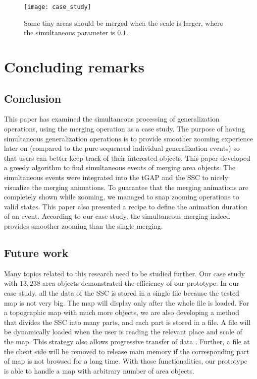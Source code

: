\documentclass[twocolumn]{svjour3}          %
\begin{document}
\begin{figure}[tb]
\centering
\texttt{[image: case\_study]}
\caption{
    Some tiny areas should be merged when the scale is larger,
    where the simultaneous parameter is $0.1$.
}
\label{fig:problem}
\end{figure}




\section{Concluding remarks}
\label{sec:concluding_remarks}

\subsection{Conclusion}
This paper has examined the simultaneous processing 
of generalization operations,
using the merging operation as a case study. 
The purpose of having simultaneous generalization operations 
is to provide smoother zooming experience later on 
(compared to the pure sequenced individual generalization events)
so that users can better keep track of their interested objects.
This paper developed a greedy algorithm to find simultaneous events of 
merging area objects.
The simultaneous events were integrated into 
the tGAP and the SSC to nicely visualize the merging animations.
To guarantee that the merging animations 
are completely shown while zooming, 
we managed to snap zooming operations to valid states.
This paper also presented a recipe 
to define the animation duration of an event.
According to our case study,
the simultaneous merging indeed provides smoother zooming
than the single merging.




\subsection{Future work}

Many topics related to this research need to be studied further.
Our case study with $13{,}238$ area objects 
demonstrated the efficiency of our prototype.
In our case study, all the data of the SSC is stored in a single file
because the tested map is not very big.
The map will display only after the whole file is loaded.
For a topographic map with much more objects,
we are also developing a method that divides the SSC into many parts, 
and each part is stored in a file.
A file will be dynamically loaded 
when the user is reading the relevant place and scale of the map.
This strategy also allows progressive transfer of data
\citep{vanOosterom2014Support}.
Further, a file at the client side will be removed to release main memory
if the corresponding part of map is not browsed for a long time. 
With those functionalities, our prototype is able to handle 
a map with arbitrary number of area objects.
\end{document}
